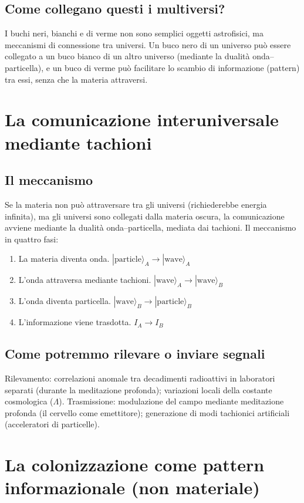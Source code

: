 \documentclass[11pt,a4paper]{article}
\begin{document}
\subsection{Come collegano questi i multiversi?}
I buchi neri, bianchi e di verme non sono semplici oggetti astrofisici, ma meccanismi di connessione tra universi. Un buco nero di un universo può essere collegato a un buco bianco di un altro universo (mediante la dualità onda--particella), e un buco di verme può facilitare lo scambio di informazione (pattern) tra essi, senza che la materia attraversi.

\section{La comunicazione interuniversale mediante tachioni}
\subsection{Il meccanismo}
Se la materia non può attraversare tra gli universi (richiederebbe energia infinita), ma gli universi sono collegati dalla materia oscura, la comunicazione avviene mediante la dualità onda--particella, mediata dai tachioni. Il meccanismo in quattro fasi:
\begin{enumerate}
    \item La materia diventa onda. $|\text{particle}\rangle_A \to |\text{wave}\rangle_A$
    \item L'onda attraversa mediante tachioni. $|\text{wave}\rangle_A \to |\text{wave}\rangle_B$
    \item L'onda diventa particella. $|\text{wave}\rangle_B \to |\text{particle}\rangle_B$
    \item L'informazione viene trasdotta. $I_A \to I_B$
\end{enumerate}

\subsection{Come potremmo rilevare o inviare segnali}
Rilevamento: correlazioni anomale tra decadimenti radioattivi in laboratori separati (durante la meditazione profonda); variazioni locali della costante cosmologica ($\Lambda$). Trasmissione: modulazione del campo mediante meditazione profonda (il cervello come emettitore); generazione di modi tachionici artificiali (acceleratori di particelle).

\section{La colonizzazione come pattern informazionale (non materiale)}
\end{document}
